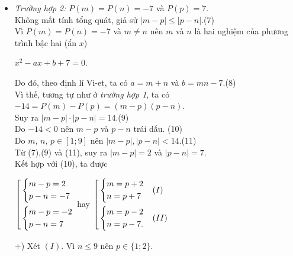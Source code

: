 \begin{bt}
{\begin{itemize}
			Do $14>0$ nên $m-p$ và $p-n$ cùng dấu. Kết hợp với $(2)$, suy ra $m-p,p-n>0$, \hfill (5)\\
			vì nếu ngược lại thì $m<p<n$, mâu thuẫn với (2).\\
			Do $m,n,p\in [1;9]$ nên $m-p,p-n<14$.\hfill (6)\\
			Từ (4), (5) và (6), suy ra 
			\begin{center}
				$\hoac{&\heva{&m-p=2\\ &p-n=7}\\ &\heva{&m-p=7\\ &p-n=2}}$ hay $\hoac{&\heva{&m=p+2\\ &p=n+7}\\ &\heva{&m=p+7\\ &p=n+2}.}$
			\end{center}
			Suy ra $m=n+9\ge 10$, mâu thuẫn với giả thiết $m\in [1;9]$. Điều này cho thấy {\it trường hợp 1} không thể xảy ra.
			\item {\it Trường hợp 2:} $P(m)=P(n)=-7$ và $P(p)=7$.\\
			Không mất tính tổng quát, giả sử $|m-p|\le |p-n|$.\hfill (7)\\
			Vì $P(m)=P(n)=-7$ và $m\ne n$ nên $m$ và $n$ là hai nghiệm của phương trình bậc hai (ẩn $x$)
			\begin{center}
				$x^2-ax+b+7=0$.
			\end{center}
			Do đó, theo định lí Vi-et, ta có $a=m+n$ và $b=mn-7$.\hfill (8)\\
			Vì thế, tương tự như ở {\it trường hợp 1}, ta có $-14=P(m)-P(p)=(m-p)(p-n)$.\\
			Suy ra $|m-p|\cdot|p-n|=14$.\hfill (9)\\
			Do $-14<0$ nên $m-p$ và $p-n$ trái dấu. \hfill (10)\\
			Do $m,\,n,\,p\in[1;9]$ nên $|m-p|,|p-n|<14$.\hfill (11)\\
			Từ (7),(9) và (11), suy ra $|m-p|=2$ và $|p-n|=7$.\\
			Kết hợp với (10), ta được
			\begin{center}
				$\left[\begin{aligned}&\left\{\begin{aligned}&m-p=2\\ &p-n=-7\end{aligned}\right.\\ &\left\{\begin{aligned}&m-p=-2\\ &p-n=7\end{aligned}\right.\end{aligned}\right.$
				hay $\left[\begin{aligned}&\left\{\begin{aligned}&m=p+2\\ &n=p+7\end{aligned}\right.&&(I)\\ &\left\{\begin{aligned}&m=p-2\\ &n=p-7.\end{aligned}\right.&&(II)\end{aligned}\right.$
			\end{center}
			+) Xét $(I)$. Vì $n\le 9$ nên $p\in\{1;2\}$.\\

\end{itemize}}
\end{bt}

